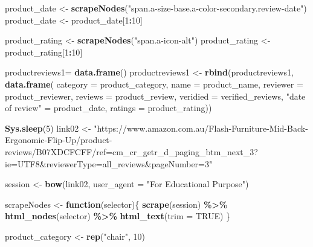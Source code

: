 \documentclass[
]{article}
\newenvironment{Shaded}{\begin{snugshade}}{\end{snugshade}}
\newcommand{\AttributeTok}[1]{\textcolor[rgb]{0.13,0.29,0.53}{#1}}
\newcommand{\ConstantTok}[1]{\textcolor[rgb]{0.56,0.35,0.01}{#1}}
\newcommand{\ControlFlowTok}[1]{\textcolor[rgb]{0.13,0.29,0.53}{\textbf{#1}}}
\newcommand{\DecValTok}[1]{\textcolor[rgb]{0.00,0.00,0.81}{#1}}
\newcommand{\FunctionTok}[1]{\textcolor[rgb]{0.13,0.29,0.53}{\textbf{#1}}}
\newcommand{\NormalTok}[1]{#1}
\newcommand{\OtherTok}[1]{\textcolor[rgb]{0.56,0.35,0.01}{#1}}
\newcommand{\SpecialCharTok}[1]{\textcolor[rgb]{0.81,0.36,0.00}{\textbf{#1}}}
\newcommand{\StringTok}[1]{\textcolor[rgb]{0.31,0.60,0.02}{#1}}
\begin{document}
\begin{Shaded}
\begin{Highlighting}[]
\NormalTok{  product\_date }\OtherTok{\textless{}{-}} \FunctionTok{scrapeNodes}\NormalTok{(}\StringTok{"span.a{-}size{-}base.a{-}color{-}secondary.review{-}date"}\NormalTok{)}
\NormalTok{  product\_date }\OtherTok{\textless{}{-}}\NormalTok{ product\_date[}\DecValTok{1}\SpecialCharTok{:}\DecValTok{10}\NormalTok{]}
  
\NormalTok{  product\_rating }\OtherTok{\textless{}{-}} \FunctionTok{scrapeNodes}\NormalTok{(}\StringTok{"span.a{-}icon{-}alt"}\NormalTok{)}
\NormalTok{  product\_rating }\OtherTok{\textless{}{-}}\NormalTok{ product\_rating[}\DecValTok{1}\SpecialCharTok{:}\DecValTok{10}\NormalTok{]}
  
\NormalTok{  productreviews1}\OtherTok{=} \FunctionTok{data.frame}\NormalTok{()}
\NormalTok{  productreviews1 }\OtherTok{\textless{}{-}} \FunctionTok{rbind}\NormalTok{(productreviews1, }\FunctionTok{data.frame}\NormalTok{(}
                      \AttributeTok{category =}\NormalTok{ product\_category,}
                      \AttributeTok{name =}\NormalTok{ product\_name,}
                      \AttributeTok{reviewer =}\NormalTok{ product\_reviewer,}
                      \AttributeTok{reviews =}\NormalTok{ product\_review,}
                      \AttributeTok{veridied =}\NormalTok{ verified\_reviews,}
                      \StringTok{"date of review"} \OtherTok{=}\NormalTok{ product\_date,}
                      \AttributeTok{ratings =}\NormalTok{ product\_rating))}

  
 \FunctionTok{Sys.sleep}\NormalTok{(}\DecValTok{5}\NormalTok{)}
\NormalTok{link02 }\OtherTok{\textless{}{-}} \StringTok{"https://www.amazon.com.au/Flash{-}Furniture{-}Mid{-}Back{-}Ergonomic{-}Flip{-}Up/product{-}reviews/B07XDCFCFF/ref=cm\_cr\_getr\_d\_paging\_btm\_next\_3?ie=UTF8\&reviewerType=all\_reviews\&pageNumber=3"}


\NormalTok{  session }\OtherTok{\textless{}{-}} \FunctionTok{bow}\NormalTok{(link02,}
               \AttributeTok{user\_agent =} \StringTok{"For Educational Purpose"}\NormalTok{)}

\NormalTok{  scrapeNodes }\OtherTok{\textless{}{-}} \ControlFlowTok{function}\NormalTok{(selector)\{}
    \FunctionTok{scrape}\NormalTok{(session) }\SpecialCharTok{\%\textgreater{}\%}
      \FunctionTok{html\_nodes}\NormalTok{(selector) }\SpecialCharTok{\%\textgreater{}\%}
      \FunctionTok{html\_text}\NormalTok{(}\AttributeTok{trim =} \ConstantTok{TRUE}\NormalTok{)}
\NormalTok{  \}}

\NormalTok{  product\_category }\OtherTok{\textless{}{-}} \FunctionTok{rep}\NormalTok{(}\StringTok{"chair"}\NormalTok{, }\DecValTok{10}\NormalTok{)}


\end{Highlighting}
\end{Shaded}
\end{document}
